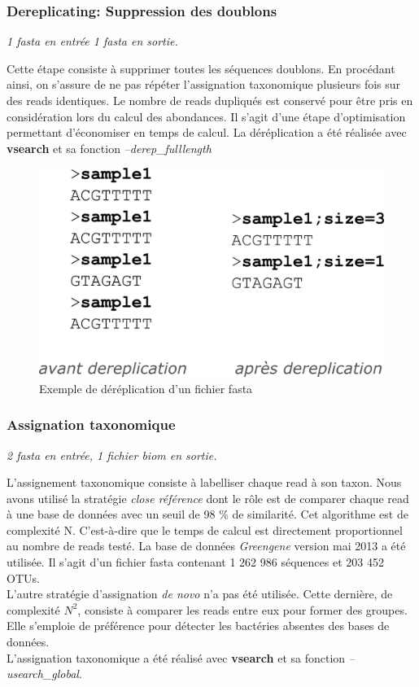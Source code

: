 \documentclass[12pt,a4paper]{article}
\begin{document}
\subsubsection{Dereplicating: Suppression des doublons}
\noindent\emph{1 fasta en entrée 1 fasta en sortie. }

Cette étape consiste à supprimer toutes les séquences doublons. En procédant ainsi, on s'assure de ne pas répéter l'assignation taxonomique plusieurs fois sur des reads identiques. Le nombre de reads dupliqués est conservé pour être pris en considération lors du calcul des abondances. Il s'agit d'une étape d'optimisation permettant d'économiser en temps de calcul. La déréplication a été réalisée avec \textbf{vsearch}\cite{TorbjornRognes2015} et sa fonction \textit{--derep\_fulllength }

\begin{figure}[ht]
\begin{center}
\includegraphics[scale=0.4]{img/dereplication.png}\hfill
\end{center}
\caption{Exemple de déréplication d'un fichier fasta}
\label{dereplication}
\end{figure}

\subsubsection{Assignation taxonomique}
\noindent\emph{2 fasta en entrée,  1 fichier biom  en sortie. }

L’assignement taxonomique consiste à labelliser chaque read à son taxon. Nous avons utilisé la stratégie \textit{close référence} dont le rôle est de comparer chaque read à une base de données avec un seuil de 98 \% de similarité. Cet algorithme est de complexité N. C'est-à-dire que le temps de calcul est directement proportionnel au nombre de reads testé. La base de données \textit{Greengene}\cite{DeSantis2006} version mai 2013  a été utilisée. Il s'agit d'un fichier fasta contenant 1 262 986 séquences et 203 452 OTUs. \\
L'autre stratégie d'assignation \textit{de novo} n'a pas été utilisée. Cette dernière, de complexité $N^{2}$, consiste à comparer les reads entre eux pour former des groupes. Elle s'emploie de préférence pour détecter les bactéries absentes des bases de données. \\
L'assignation taxonomique a été réalisé avec \textbf{vsearch} et sa fonction \textit{--usearch\_global}.
\end{document}
